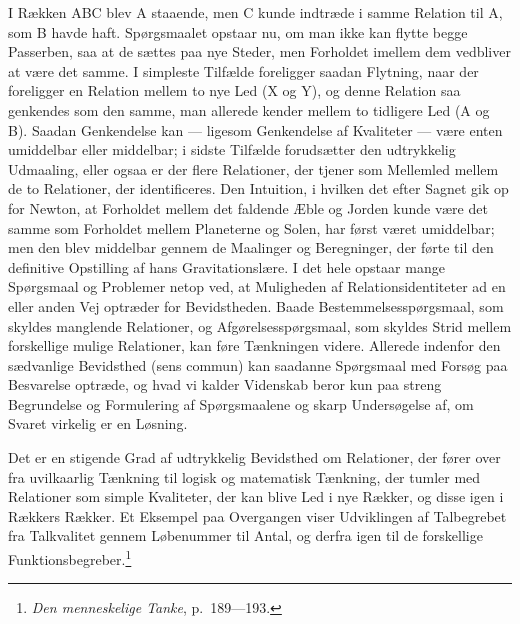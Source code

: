 \documentclass[12pt]{article}
\newcommand{\opage}[1]{\marginnote{\footnotesize\textit{[#1]}}}
\begin{document}
I Rækken ABC blev A staaende, men C kunde indtræde i samme Relation til A, som B
havde haft. Spørgsmaalet opstaar nu, om man ikke kan flytte begge Passerben, saa
at de sættes paa nye Steder, men Forholdet imellem dem vedbliver at være det
samme. I simpleste Tilfælde
\opage{24} foreligger saadan Flytning, naar der foreligger en Relation mellem to nye Led (X
og Y), og denne Relation saa genkendes som den samme, man allerede kender mellem
to tidligere Led (A og B). Saadan Genkendelse kan --- ligesom Genkendelse af
Kvaliteter --- være enten umiddelbar eller middelbar; i sidste Tilfælde
forudsætter den udtrykkelig Udmaaling, eller ogsaa er der flere Relationer, der
tjener som Mellemled mellem de to Relationer, der identificeres. Den Intuition,
i hvilken det efter Sagnet gik op for Newton, at Forholdet mellem det faldende
Æble og Jorden kunde være det samme som Forholdet mellem Planeterne og Solen,
har først været umiddelbar; men den blev middelbar gennem de Maalinger og
Beregninger, der førte til den definitive Opstilling af hans Gravitationslære. I
det hele opstaar mange Spørgsmaal og Problemer netop ved, at Muligheden af
Relationsidentiteter ad en eller anden Vej optræder for Bevidstheden. Baade
Bestemmelsesspørgsmaal, som skyldes manglende Relationer, og
Afgørelsesspørgsmaal, som skyldes Strid mellem forskellige mulige Relationer,
kan føre Tænkningen videre. Allerede indenfor den sædvanlige Bevidsthed (sens
commun) kan saadanne Spørgsmaal med Forsøg paa Besvarelse optræde, og hvad vi
kalder Videnskab beror kun paa streng Begrundelse og Formulering af
Spørgsmaalene og skarp Undersøgelse af, om Svaret virkelig er en Løsning.

Det er en stigende Grad af udtrykkelig Bevidsthed om Relationer, der fører over
fra uvilkaarlig Tænkning til logisk og matematisk Tænkning, der tumler med
Relationer som simple Kvaliteter, der kan blive Led i nye Rækker, og disse igen
i Rækkers Rækker. Et Eksempel paa Overgangen viser Udviklingen af Talbegrebet
fra Talkvalitet gennem
\opage{25} \setcounter{footnote}{0}%
Løbenummer til Antal, og derfra igen til de forskellige
Funktionsbegreber.\footnote{\textit{Den menneskelige Tanke}, p.~189---193.}
\end{document}
